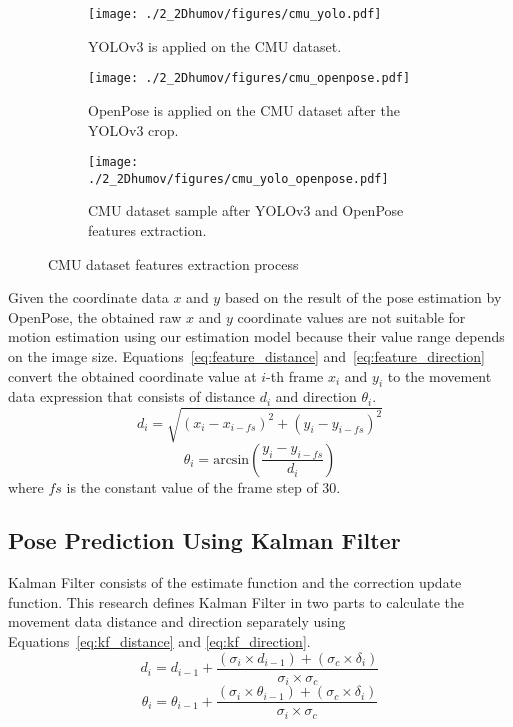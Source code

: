 \begin{figure}
    \centering
    \begin{subfigure}[t]{0.45\textwidth}
        \centering
        \texttt{[image: ./2\_2Dhumov/figures/cmu\_yolo.pdf]}
        \caption{YOLOv3 is applied on the CMU dataset.}
        \label{fig:2_cmuyolo}
    \end{subfigure}
    \begin{subfigure}[t]{0.45\textwidth}
        \centering
        \texttt{[image: ./2\_2Dhumov/figures/cmu\_openpose.pdf]}
        \caption{OpenPose is applied on the CMU dataset after the YOLOv3 crop.}
        \label{fig:2_cmuopenpose}
    \end{subfigure}
    \begin{subfigure}[t]{0.5\textwidth}
        \centering
        \texttt{[image: ./2\_2Dhumov/figures/cmu\_yolo\_openpose.pdf]}
        \caption{CMU dataset sample after YOLOv3 and OpenPose features extraction.}
        \label{fig:2_cmuyoloopenpose}
    \end{subfigure}
    \caption{CMU dataset features extraction process}
    \label{fig:2_cmu_feature_extract}
\end{figure}

Given the coordinate data $x$ and $y$ based on the result of the pose estimation by OpenPose, the obtained raw $x$ and $y$ coordinate values are not suitable for motion estimation using our estimation model because their value range depends on the image size. Equations~\ref{eq:feature_distance} and~\ref{eq:feature_direction} convert the obtained coordinate value at $i$-th frame $x_i$ and $y_i$ to the movement data expression that consists of distance $d_i$ and direction $\theta_{i}$.
\begin{equation}\label{eq:feature_distance}
    d_i = \sqrt{( x_i - x_{i-fs})^2 + ( y_i - y_{i-fs} )^2 }
\end{equation}
\begin{equation}\label{eq:feature_direction}
    \theta_i = \mathrm{arcsin} \left( \frac{y_i - y_{i-fs}}{d_i} \right)
\end{equation}
where $fs$ is the constant value of the frame step of 30.

\subsection{Pose Prediction Using Kalman Filter}\label{2:proposed_kalmanfilter}
Kalman Filter consists of the estimate function and the correction update function. This research defines Kalman Filter in two parts to calculate the movement data distance and direction separately using Equations~\ref{eq:kf_distance} and \ref{eq:kf_direction}. 
\begin{equation}\label{eq:kf_distance}
    d_i = d_{i-1} + \frac{(\sigma_i \times d_{i-1}) + (\sigma_c \times \delta_i)} {\sigma_i \times \sigma_c}
\end{equation}
\begin{equation}\label{eq:kf_direction}
    \theta_i = \theta_{i-1} + \frac{(\sigma_i \times \theta_{i-1}) + (\sigma_c \times \delta_i)} {\sigma_i \times \sigma_c}
\end{equation}


